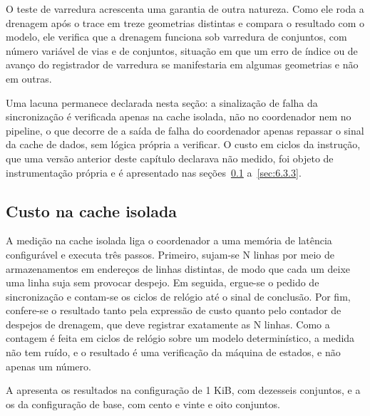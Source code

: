 O teste de varredura acrescenta uma garantia de outra natureza. Como ele roda a drenagem após o trace em treze geometrias distintas e compara o resultado com o modelo, ele verifica que a drenagem funciona sob varredura de conjuntos, com número variável de vias e de conjuntos, situação em que um erro de índice ou de avanço do registrador de varredura se manifestaria em algumas geometrias e não em outras.

Uma lacuna permanece declarada nesta seção: a sinalização de falha da sincronização é verificada apenas na cache isolada, não no coordenador nem no pipeline, o que decorre de a saída de falha do coordenador apenas repassar o sinal da cache de dados, sem lógica própria a verificar. O custo em ciclos da instrução, que uma versão anterior deste capítulo declarava não medido, foi objeto de instrumentação própria e é apresentado nas seções~\ref{sec:6.3.1} a~\ref{sec:6.3.3}.

\subsection{Custo na cache isolada}\label{sec:6.3.1}

A medição na cache isolada liga o coordenador a uma memória de latência configurável e executa três passos. Primeiro, sujam-se N linhas por meio de armazenamentos em endereços de linhas distintas, de modo que cada um deixe uma linha suja sem provocar despejo. Em seguida, ergue-se o pedido de sincronização e contam-se os ciclos de relógio até o sinal de conclusão. Por fim, confere-se o resultado tanto pela expressão de custo quanto pelo contador de despejos de drenagem, que deve registrar exatamente as N linhas. Como a contagem é feita em ciclos de relógio sobre um modelo determinístico, a medida não tem ruído, e o resultado é uma verificação da máquina de estados, e não apenas um número.

A  apresenta os resultados na configuração de 1 KiB, com dezesseis conjuntos, e a  os da configuração de base, com cento e vinte e oito conjuntos.

